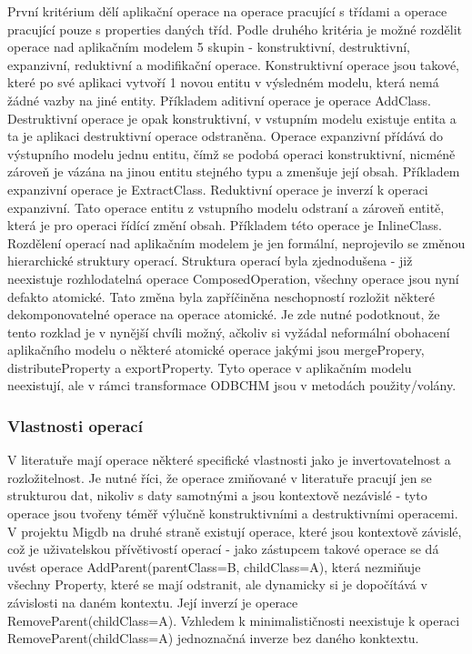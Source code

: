 \documentclass[11pt,twoside,a4paper]{book}
\begin{document}
První kritérium dělí aplikační operace na operace pracující s třídami a operace
pracující pouze s properties daných tříd. Podle druhého kritéria je možné
rozdělit operace nad aplikačním modelem 5 skupin - konstruktivní, destruktivní,
expanzivní, reduktivní a modifikační operace. Konstruktivní operace jsou takové,
které po své aplikaci vytvoří 1 novou entitu v výsledném modelu, která nemá žádné 
vazby na jiné entity. Příkladem aditivní operace je
operace AddClass. Destruktivní operace je opak konstruktivní, v vstupním modelu
existuje entita a ta je aplikaci destruktivní operace odstraněna. Operace
expanzivní přídává do výstupního modelu jednu entitu, čímž se podobá operaci
konstruktivní, nicméně zároveň je vázána na jinou entitu stejného typu a
zmenšuje její obsah. Příkladem expanzivní operace je ExtractClass. Reduktivní
operace je inverzí k operaci expanzivní. Tato operace entitu z vstupního
modelu odstraní a zároveň entitě, která je pro operaci řídící změní obsah.
Příkladem této operace je InlineClass.\\

Rozdělení operací nad aplikačním modelem je jen formální, neprojevilo se změnou
hierarchické struktury operací. Struktura operací byla zjednodušena - již
neexistuje rozhlodatelná operace ComposedOperation, všechny operace jsou nyní
defakto atomické. Tato změna byla zapříčiněna neschopností rozložit některé
dekomponovatelné operace na operace atomické. Je zde nutné podotknout, že tento
rozklad je v nynější chvíli možný, ačkoliv si vyžádal neformální
obohacení aplikačního modelu o některé atomické operace jakými jsou
mergePropery, distributeProperty a exportProperty. Tyto operace v aplikačním
modelu neexistují, ale v rámci transformace ODBCHM jsou v metodách
použity/volány.\\

\subsubsection{Vlastnosti operací}

V literatuře mají operace některé specifické vlastnosti jako je
invertovatelnost a rozložitelnost. Je nutné říci, že operace zmiňované v
literatuře pracují jen se strukturou dat, nikoliv s daty samotnými a jsou
kontextově nezávislé - tyto operace jsou tvořeny téměř výlučně konstruktivními
a destruktivními operacemi. V projektu Migdb na druhé straně existují operace, 
které jsou kontextově závislé, což je uživatelskou přívětivostí
operací - jako zástupcem takové operace se dá uvést operace
AddParent(parentClass=B, childClass=A), která nezmiňuje všechny Property, které
se mají odstranit, ale dynamicky si je dopočítává v závislosti na daném
kontextu. Její inverzí je operace RemoveParent(childClass=A). Vzhledem k
minimalističnosti neexistuje k operaci RemoveParent(childClass=A) jednoznačná 
inverze bez daného konktextu.
\end{document}
